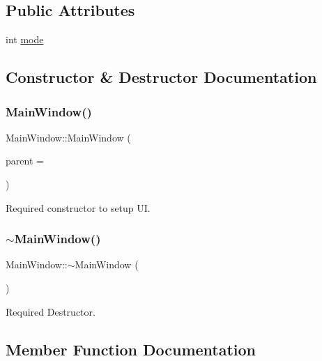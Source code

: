 \subsection*{Public Attributes}
\begin{DoxyCompactItemize}
\item 
int \hyperlink{classMainWindow_a0d680234c97ecdc151020dd0ec09cc54}{mode}
\end{DoxyCompactItemize}


\subsection{Constructor \& Destructor Documentation}
\mbox{\label{classMainWindow_a8b244be8b7b7db1b08de2a2acb9409db}} 
\subsubsection{\texorpdfstring{Main\+Window()}{MainWindow()}}
{\footnotesize\ttfamily Main\+Window\+::\+Main\+Window (\begin{DoxyParamCaption}\item[{Q\+Widget $\ast$}]{parent = {} }\end{DoxyParamCaption})\hspace{0.3cm}{\ttfamily [explicit]}}



Required constructor to setup UI. 

\mbox{\label{classMainWindow_ae98d00a93bc118200eeef9f9bba1dba7}} 
\subsubsection{\texorpdfstring{$\sim$\+Main\+Window()}{~MainWindow()}}
{\footnotesize\ttfamily Main\+Window\+::$\sim$\+Main\+Window (\begin{DoxyParamCaption}{ }\end{DoxyParamCaption})}



Required Destructor. 



\subsection{Member Function Documentation}
\mbox{\label{classMainWindow_acc4ea38c583bc825f258ab2ec432e835}} 

